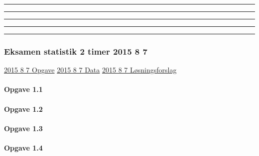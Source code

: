 \documentclass[]{book}
\let\oldparagraph\paragraph
\renewcommand{\paragraph}[1]{\oldparagraph{#1}\mbox{}}
\begin{document}
\begin{center}\rule{0.5\linewidth}{\linethickness}\end{center}

\begin{center}\rule{0.5\linewidth}{\linethickness}\end{center}

\begin{center}\rule{0.5\linewidth}{\linethickness}\end{center}

\begin{center}\rule{0.5\linewidth}{\linethickness}\end{center}

\begin{center}\rule{0.5\linewidth}{\linethickness}\end{center}

\hypertarget{eksamen-statistik-2-timer-2015-8-7}{%
\subsubsection{Eksamen statistik 2 timer 2015 8 7}\label{eksamen-statistik-2-timer-2015-8-7}}

\href{https://www.dropbox.com/s/dwbpp3ykq17tbvb/2015\%208\%207\%201.reeksamen.pdf?dl=1}{2015 8 7 Opgave}
\href{https://www.dropbox.com/s/45d1xkhjp3c0owh/2015\%208\%207\%20Data.xlsx?dl=1}{2015 8 7 Data}
\href{https://www.dropbox.com/s/9nhbc21yth3si6o/2015\%208\%207\%20Freestat\%20skabelon\%20l\%C3\%B8sning.docx?dl=1}{2015 8 7 Løsningsforslag}

\hypertarget{opgave-1.1}{%
\paragraph{Opgave 1.1}\label{opgave-1.1}}

\hypertarget{opgave-1.2}{%
\paragraph{Opgave 1.2}\label{opgave-1.2}}

\hypertarget{opgave-1.3}{%
\paragraph{Opgave 1.3}\label{opgave-1.3}}

\hypertarget{opgave-1.4}{%
\paragraph{Opgave 1.4}\label{opgave-1.4}}
\end{document}
